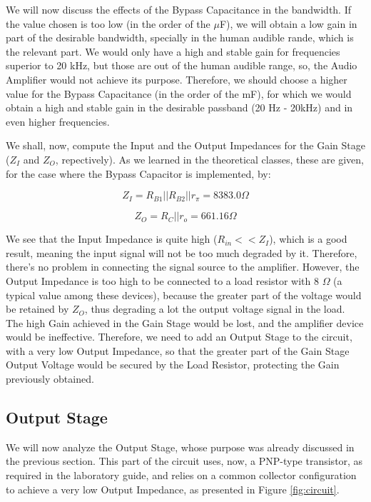 We will now discuss the effects of the Bypass Capacitance in the bandwidth. If the value chosen is too low (in the order of the $\mu$F), we will obtain a low gain in part of the desirable bandwidth, specially in the human audible rande, which is the relevant part. We would only have a high and stable gain for frequencies superior to 20 kHz, but those are out of the human audible range, so, the Audio Amplifier would not achieve its purpose. Therefore, we should choose a higher value for the Bypass Capacitance (in the order of the mF), for which we would obtain a high and stable gain in the desirable passband (20 Hz - 20kHz) and in even higher frequencies.

We shall, now, compute the Input and the Output Impedances for the Gain Stage ($Z_I$ and $Z_O$, repectively). As we learned in the theoretical classes, these are given, for the case where the Bypass Capacitor is implemented, by:

\begin{equation}
	Z_I = R_{B1}||R_{B2}||r_{\pi} = 8383.0 \Omega
	\label{inputImpGS}
\end{equation}

\begin{equation}
	Z_O = R_C||r_o =  661.16 \Omega
	\label{outputImpGS}
\end{equation}

We see that the Input Impedance is quite high ($R_{in} << Z_I$), which is a good result, meaning the input signal will not be too much degraded by it. Therefore, there's no problem in connecting the signal source to the amplifier.
However, the Output Impedance is too high to be connected to a load resistor with 8 $\Omega$ (a typical value among these devices), because the greater part of the voltage would be retained by $Z_O$, thus degrading a lot the output voltage signal in the load. The high Gain achieved in the Gain Stage would be lost, and the amplifier device would be ineffective. Therefore, we need to add an Output Stage to the circuit, with a very low Output Impedance, so that the greater part of the Gain Stage Output Voltage would be secured by the Load Resistor, protecting the Gain previously obtained.

\subsection{Output Stage}

We will now analyze the Output Stage, whose purpose was already discussed in the previous section. This part of the circuit uses, now, a PNP-type transistor, as required in the laboratory guide, and relies on a common collector configuration to achieve a very low Output Impedance, as presented in Figure \ref{fig:circuit}.

